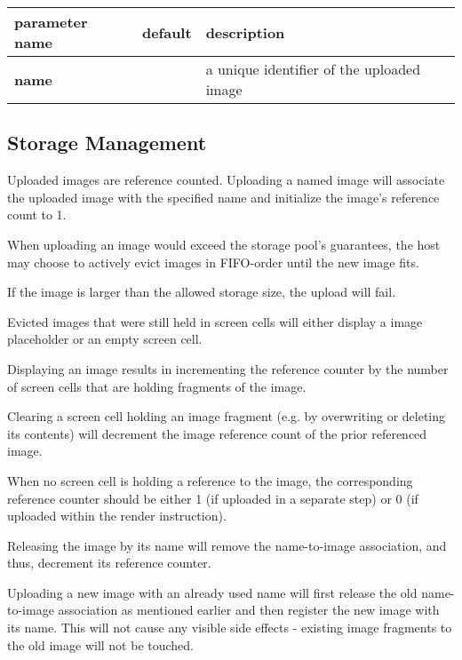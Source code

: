 \documentclass[a4paper]{article}
\begin{document}
\begin{tabular}{|l|l|l|}
    \hline
    \textbf{parameter name} & \textbf{default} & \textbf{description} \\
    \hline
    \textbf{name}       & & a unique identifier of the uploaded image \\
    \hline
\end{tabular}

\subsection{Storage Management} %

Uploaded images are reference counted.
Uploading a named image will associate the uploaded image with the specified
name and initialize the image's reference count to 1.

When uploading an image would exceed the storage pool's guarantees,
the host may choose to actively evict images in FIFO-order until the new image fits.

If the image is larger than the allowed storage size, the upload will fail.

Evicted images that were still held in screen cells will
either display a image placeholder or an empty screen cell.

Displaying an image results in incrementing the reference counter
by the number of screen cells that are holding fragments of the image.

Clearing a screen cell holding an image fragment (e.g. by overwriting
or deleting its contents) will decrement the image reference count of
the prior referenced image.

When no screen cell is holding a reference to the image,
the corresponding reference counter should be either 1 (if uploaded in a separate step)
or 0 (if uploaded within the render instruction).

Releasing the image by its name will remove the name-to-image association, and thus,
decrement its reference counter.

Uploading a new image with an already used name will first release the old name-to-image association
as mentioned earlier and then register the new image with its name. This will not cause
any visible side effects - existing image fragments to the old image will not be touched.
\end{document}
